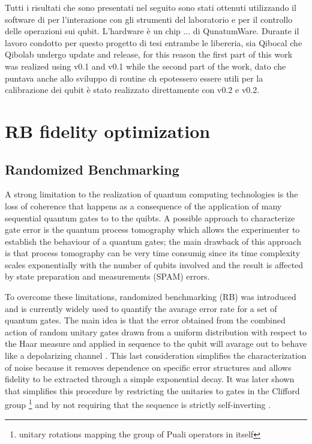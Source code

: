 Tutti i risultati che sono presentati nel seguito sono stati ottenuti utilizzando il software di \Qibolab per l'interazione con gli strumenti del laboratorio e \Qibocal per il controllo delle operazioni sui qubit.
L'hardware è un chip ... di QunatumWare.
Durante il lavoro condotto per questo progetto di tesi entrambe le libereria, sia Qibocal che Qibolab undergo update and release, for this reason the first part of this work was realized using \Qibocal v0.1 and \Qibolab v0.1 while the second part of the work, 
dato che puntava anche allo sviluppo di routine ch epotessero essere utili per la calibrazione dei qubit è stato realizzato direttamente con \Qibocal v0.2 e \Qibolab v0.2. 

\section{RB fidelity optimization}

\subsection{Randomized Benchmarking}\label{RBsection}
A strong limitation to the realization of quantum computing technologies is the loss of coherence that happens as a consequence of the application of many sequential quantum gates to to the quibts.
A possible approach to characterize gate error is the quantum process tomography which allows the experimenter to establish the behaviour of a quantum gates; the main drawback of this approach is that process tomography can be very time consumig since its time complexity scales exponentially with the number of qubits involved \cite{QPTomography} and the result is affected by state preparation and measurements (SPAM) errors.

To overcome these limitations, randomized benchmarking (RB) was introduced and is currently widely used to quantify the avarage error rate for a set of quantum gates.
The main idea is that the error obtained from the combined action of random unitary gates drawn from a uniform distribution with respect to the Haar measure \cite{Mele_2024} and applied in sequence to the qubit will avarage out to behave like a depolarizing channel \cite{Emerson_2005_RB}.
This last consideration simplifies the characterization of noise because it removes dependence on specific error structures and allows fidelity to be extracted through a simple exponential decay.
It was later shown that simplifies this procedure by restricting the unitaries to gates in the Clifford group \footnote{unitary rotations mapping the group of Puali operators in itself} and by not requiring that the sequence is strictly self-inverting \cite{knill_randomized_2008}.
\begin{comment}
    The Haar measure is crucial because it provides a unique, invariant way of selecting random elements from a group (in this case, unitary gates) that ensures the randomness is truly uniform and unbiased across the group's structure.
\end{comment}

